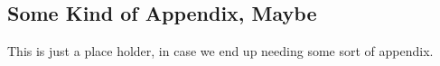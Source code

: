 \documentclass[12pt]{article}
\theoremstyle{definition}
\begin{document}
\begin{appendix}

\section{Some Kind of Appendix, Maybe} \label{app:Cyclic}

This is just a place holder, in case we end up needing some sort of appendix. 



\end{appendix}



\end{document}
